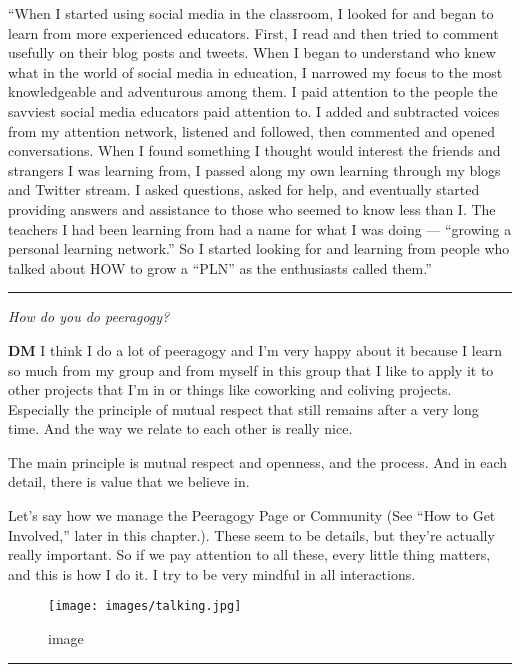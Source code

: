 ``When I started using social media in the classroom, I looked for and
began to learn from more experienced educators. First, I read and then
tried to comment usefully on their blog posts and tweets. When I began
to understand who knew what in the world of social media in education, I
narrowed my focus to the most knowledgeable and adventurous among them.
I paid attention to the people the savviest social media educators paid
attention to. I added and subtracted voices from my attention network,
listened and followed, then commented and opened conversations. When I
found something I thought would interest the friends and strangers I was
learning from, I passed along my own learning through my blogs and
Twitter stream. I asked questions, asked for help, and eventually
started providing answers and assistance to those who seemed to know
less than I. The teachers I had been learning from had a name for what I
was doing --- ``growing a personal learning network.'' So I started
looking for and learning from people who talked about HOW to grow a
``PLN'' as the enthusiasts called them.''

\begin{center}\rule{0.5\linewidth}{0.5pt}\end{center}

\emph{How do you do peeragogy?}

\textbf{DM} I think I do a lot of peeragogy and I'm very happy about it
because I learn so much from my group and from myself in this group that
I like to apply it to other projects that I'm in or things like
co­working and co­living projects. Especially the principle of mutual
respect that still remains after a very long time. And the way we relate
to each other is really nice.

The main principle is mutual respect and openness, and the process. And
in each detail, there is value that we believe in.

Let's say how we manage the Peeragogy Page or Community (See ``How to
Get Involved,'' later in this chapter.). These seem to be details, but
they're actually really important. So if we pay attention to all these,
every little thing matters, and this is how I do it. I try to be very
mindful in all interactions.

\begin{figure}
\centering
\texttt{[image: images/talking.jpg]}
\caption{image}
\end{figure}

\begin{center}\rule{0.5\linewidth}{0.5pt}\end{center}

